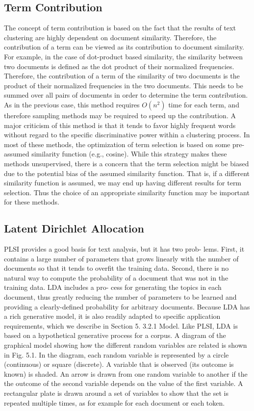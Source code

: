 \subsection{Term Contribution}
The concept of term contribution \cite{Liu2003} is based on the fact that the results of text clustering are highly dependent on document similarity. Therefore, the contribution of a term can be viewed as its contribution to document similarity. For example, in the case of dot-product based similarity, the similarity between two documents is defined as the dot product of their normalized frequencies. Therefore, the contribution of a term of the similarity of two documents is the product of their normalized frequencies in the two documents. This needs to be summed over all pairs of documents in order to determine the term contribution. As in the previous case, this method requires $O(n^2)$ time for each term, and therefore sampling methods may be required to speed up the contribution. A major criticism of this method is that it tends to favor highly frequent words without regard to the specific discriminative power within a clustering process. In most of these methods, the optimization of term selection is based on some pre-assumed similarity function (e.g., cosine). While this strategy makes these methods unsupervised, there is a concern that the term selection might be biased due to the potential bias of the assumed similarity function. That is, if a different similarity function is assumed, we may end up having different results for term selection. Thus the choice of an appropriate similarity function may be important for these methods.


\subsection{Latent Dirichlet Allocation}

PLSI provides a good basis for text analysis, but it has two prob-
lems. First, it contains a large number of parameters that grows linearly
with the number of documents so that it tends to overfit the training
data. Second, there is no natural way to compute the probability of
a document that was not in the training data. LDA includes a pro-
cess for generating the topics in each document, thus greatly reducing
the number of parameters to be learned and providing a clearly-defined
probability for arbitrary documents. Because LDA has a rich generative
model, it is also readily adapted to specific application requirements,
which we describe in Section 5.
3.2.1 Model. Like PLSI, LDA is based on a hypothetical generative process for a corpus. A diagram of the graphical model showing how the different random variables are related is shown in Fig. 5.1. In the diagram, each random variable is represented by a circle (continuous) or square (discrete). A variable that is observed (its outcome is known) is shaded. An arrow is drawn from one random variable to another if the the outcome of the second variable depends on the value of the first variable. A rectangular plate is drawn around a set of variables to show that the set is repeated multiple times, as for example for each document or each token.

